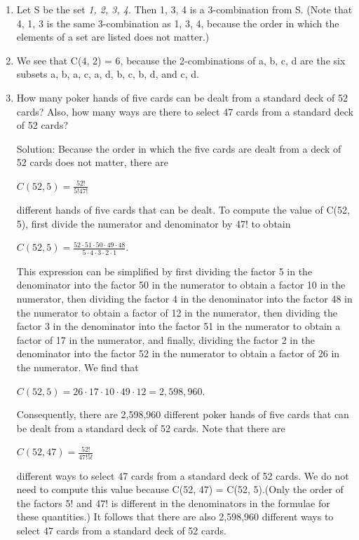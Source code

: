 \documentclass[11pt,a4paper]{book}
\begin{document}
\begin{enumerate}[label=Example~\arabic*]
\item Let S be the set \emph{{1, 2, 3, 4}}.
Then {1, 3, 4} is a 3-combination from S. (Note that {4, 1, 3} is the same 3-combination as {1, 3, 4}, because the order in which the elements of a set are listed does not matter.)

\item We see that C(4, 2) = 6, because the 2-combinations of {a, b, c, d} are the six subsets {a, b}, {a, c}, {a, d}, {b, c}, {b, d}, and {c, d}.

\item How many poker hands of five cards can be dealt from a standard deck of 52 cards?
Also, how many ways are there to select 47 cards from a standard deck of 52 cards?

Solution: Because the order in which the five cards are dealt from a deck of 52 cards does not matter, there are

$C(52, 5) = \frac{52!}{5!47!}$

different hands of five cards that can be dealt. 
To compute the value of C(52, 5), first divide the numerator and denominator by 47! to obtain

$C(52, 5) = \frac{52 \cdot 51 \cdot 50 \cdot 49 \cdot 48}{5 \cdot 4 \cdot 3 \cdot 2 \cdot 1}.$

This expression can be simplified by first dividing the factor 5 in the denominator into the factor 50 in the numerator to obtain a factor 10 in the numerator, then dividing the factor 4 in the denominator into the factor 48 in the numerator to obtain a factor of 12 in the numerator, then dividing the factor 3 in the denominator into the factor 51 in the numerator to obtain a factor of 17 in the numerator, and finally, dividing the factor 2 in the denominator into the factor 52 in the numerator to obtain a factor of 26 in the numerator.
We find that

$C(52, 5) = 26 \cdot 17 \cdot 10 \cdot 49 \cdot 12 = 2,598,960.$

Consequently, there are 2,598,960 different poker hands of five cards that can be dealt from a standard deck of 52 cards.
Note that there are

$C(52, 47) = \frac{52!}{47!5!}$

different ways to select 47 cards from a standard deck of 52 cards.
We do not need to compute this value because C(52, 47) = C(52, 5).(Only the order of the factors 5! and 47! is different in the denominators in the formulae for these quantities.)
It follows that there are also 2,598,960 different ways to select 47 cards from a standard deck of 52 cards.


\end{enumerate}
\end{document}
